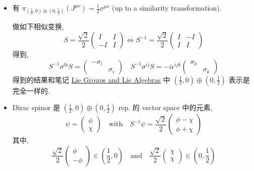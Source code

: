 \begin{itemize}
	\noindent\rule[0.5ex]{\linewidth}{0.5pt} %
	
	\item 有 $\pi_{(\frac{1}{2}, 0) \oplus (0, \frac{1}{2})}(J^{\mu \nu}) = \frac{1}{2} \sigma^{\mu \nu}$ (up to a similarity transformation).
	
	\begin{tcolorbox}[title=calculation:]
		做如下相似变换,
		\begin{equation}
			S = \frac{\sqrt{2}}{2} \begin{pmatrix}
				I & I \\
				- I & I
			\end{pmatrix} \iff S^{- 1} = \frac{\sqrt{2}}{2} \begin{pmatrix}
				I & - I \\
				I & I
			\end{pmatrix}
		\end{equation}
		得到,
		\begin{equation}
			S^{- 1} \sigma^{0 i} S = \begin{pmatrix}
				- \sigma_i & \\
				& \sigma_i
			\end{pmatrix} \quad S^{- 1} \sigma^{i j} S = - i \epsilon^{i j k} \begin{pmatrix}
				\sigma_k & \\
				& \sigma_k
			\end{pmatrix}
		\end{equation}
		得到的结果和笔记 \href{https://github.com/siyang03/my-note---Lie-Groups-and-Lie-Algebras}{Lie Groups and Lie Algebras} 中 $(\frac{1}{2}, 0) \oplus (0, \frac{1}{2})$ 表示是完全一样的.
	\end{tcolorbox}
	
	\item Dirac spinor 是 $(\frac{1}{2}, 0) \oplus (0, \frac{1}{2})$ rep. 的 vector space 中的元素,
	\begin{equation}
		\psi = \begin{pmatrix}
			\phi \\
			\chi
		\end{pmatrix} \quad \text{with} \quad S^{- 1} \psi = \frac{\sqrt{2}}{2} \begin{pmatrix}
			\phi - \chi \\
			\phi + \chi
		\end{pmatrix}
	\end{equation}
	其中,
	\begin{equation}
		\frac{\sqrt{2}}{2} \begin{pmatrix}
			\phi \\
			- \phi
		\end{pmatrix} \in (\frac{1}{2}, 0) \quad \text{and} \quad \frac{\sqrt{2}}{2} \begin{pmatrix}
			\chi \\
			\chi
		\end{pmatrix} \in (0, \frac{1}{2})
	\end{equation}
	

\end{itemize}
